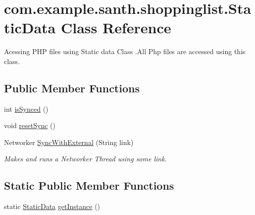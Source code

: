 \hypertarget{classcom_1_1example_1_1santh_1_1shoppinglist_1_1_static_data}{}\section{com.\+example.\+santh.\+shoppinglist.\+Static\+Data Class Reference}
\label{classcom_1_1example_1_1santh_1_1shoppinglist_1_1_static_data}


Acessing P\+HP files using Static data Class .All Php files are accessed using this class.  


\subsection*{Public Member Functions}
\begin{DoxyCompactItemize}
\item 
int \hyperlink{classcom_1_1example_1_1santh_1_1shoppinglist_1_1_static_data_a445c4ebee6294ee8733769490e251d77}{is\+Synced} ()
\item 
void \hyperlink{classcom_1_1example_1_1santh_1_1shoppinglist_1_1_static_data_acaf2c918f21006b2327259bbe8e4c560}{reset\+Sync} ()
\item 
Networker \hyperlink{classcom_1_1example_1_1santh_1_1shoppinglist_1_1_static_data_a3fa6524314249be47286f9c1e77fcd38}{Sync\+With\+External} (String link)
\begin{DoxyCompactList}\small\item\em Makes and runs a Networker Thread using some link. \end{DoxyCompactList}\end{DoxyCompactItemize}
\subsection*{Static Public Member Functions}
\begin{DoxyCompactItemize}
\item 
static \hyperlink{classcom_1_1example_1_1santh_1_1shoppinglist_1_1_static_data}{Static\+Data} \hyperlink{classcom_1_1example_1_1santh_1_1shoppinglist_1_1_static_data_aa8186e28e5e45b71c96b252fe5b95e7a}{get\+Instance} ()
\end{DoxyCompactItemize}
